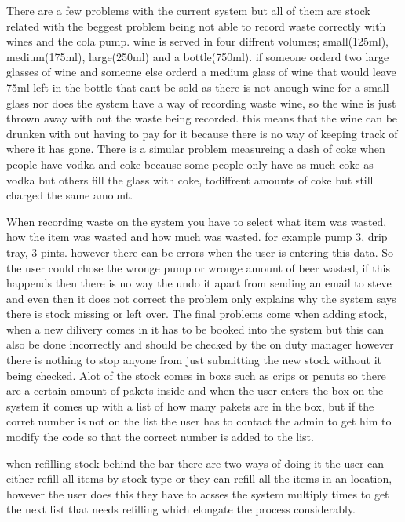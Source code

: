 There are a few problems with the current system but all of them are stock related with the beggest problem being not able to record waste correctly with wines and the cola pump. wine is served in four diffrent volumes; small(125ml), medium(175ml), large(250ml) and a bottle(750ml). if someone orderd two large glasses of wine and someone else orderd a medium glass of wine that would leave 75ml left in the bottle that cant be sold as there is not anough wine for a small glass nor does the system have a way of recording waste wine, so the wine is just thrown away with out the waste being recorded. this means that the wine can be drunken with out having to pay for it because there is no way of keeping track of where it has gone. There is a simular problem measureing a dash of coke when people have vodka and coke because some people only have as much coke as vodka but others fill the glass with coke, todiffrent amounts of coke but still charged the same amount.

When recording waste on the system you have to select what item was wasted, how the item was wasted and how much was wasted. for example pump 3, drip tray, 3 pints. however there can be errors when the user is entering this data. So the user could chose the wronge pump or wronge amount of beer wasted, if this happends then there is no way the undo it apart from sending an email to steve and even then it does not correct the problem only explains why the system says there is stock missing or left over. The final problems come when adding stock, when a new dilivery comes in it has to be booked into the system but this can also be done incorrectly and should be checked by the on duty manager however there is nothing to stop anyone from just submitting the new stock without it being checked. Alot of the stock comes in boxs such as crips or penuts so there are a certain amount of pakets inside and when the user enters the box on the system it comes up with a list of how many pakets are in the box, but if the corret number is not on the list the user has to contact the admin to get him to modify the code so that the correct number is added to the list.

when refilling stock behind the bar there are two ways of doing it the user can either refill all items by stock type or they can refill all the items in an location, however the user does this they have to acsses the system multiply times to get the next list that needs refilling which elongate the process considerably.



